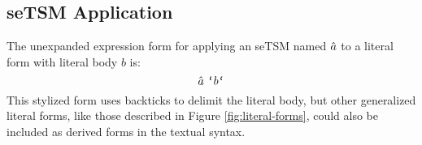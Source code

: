 \subsection{seTSM Application}\label{sec:U-uetsm-application}
The unexpanded expression form for applying an seTSM named $\hat{a}$ to a literal form with literal body $b$ is:
\[
\utsmap{\tsmv}{b}
\] 
This stylized form uses backticks to delimit the literal body, but other generalized literal forms, like those described in Figure \ref{fig:literal-forms}, could also be included as derived forms in the textual syntax. %

